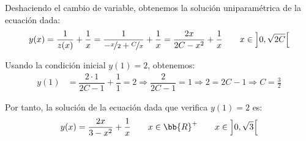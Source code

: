 \begin{ejercicio}
    Deshaciendo el cambio de variable, obtenemos la solución uniparamétrica de la ecuación dada:
    \begin{equation*}
        y(x) = \dfrac{1}{z(x)} + \dfrac{1}{x} = \dfrac{1}{-\nicefrac{x}{2} + \nicefrac{C}{x}} + \dfrac{1}{x} = \dfrac{2x}{2C-x^2} + \dfrac{1}{x}
        \qquad x\in \left]0,\sqrt{2C}\right[
    \end{equation*}

    Usando la condición inicial $y(1)=2$, obtenemos:
    \begin{align*}
        y(1) &= \dfrac{2\cdot 1}{2C-1} + \dfrac{1}{1} = 2 \Longrightarrow \dfrac{2}{2C-1} = 1 \Longrightarrow 2 = 2C - 1 \Longrightarrow C=\frac{3}{2}
    \end{align*}

    Por tanto, la solución de la ecuación dada que verifica $y(1)=2$ es:
    \begin{equation*}
        y(x) = \dfrac{2x}{3-x^2} + \dfrac{1}{x} \qquad x\in \bb{R}^+
        \qquad x\in \left]0,\sqrt{3}\right[
    \end{equation*}
\end{ejercicio}

